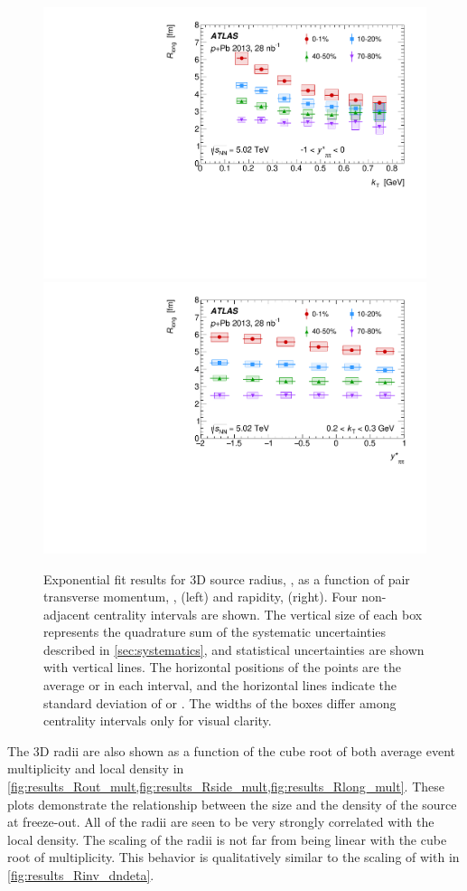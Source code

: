 \begin{figure}[t]
\centering
\includegraphics[width=.49\linewidth]{canqosl_Rlong_vs_kt.pdf}
\includegraphics[width=.49\linewidth]{canqosl_Rlong_vs_kys.pdf}
\caption{Exponential fit results for 3D source radius, \Rlong, as a function of pair transverse momentum, \kt, (left) and rapidity, \kys (right). Four non-adjacent centrality intervals are shown. The vertical size of each box represents the quadrature sum of the systematic uncertainties described in \cref{sec:systematics}, and statistical uncertainties are shown with vertical lines. The horizontal positions of the points are the average \kt or \kys in each interval, and the horizontal lines indicate the standard deviation of \kt or \kys. The widths of the boxes differ among centrality intervals only for visual clarity.}
\label{fig:results_Rlong}
\end{figure}

The 3D radii are also shown as a function of the cube root of both average event multiplicity and local density
in \cref{fig:results_Rout_mult,fig:results_Rside_mult,fig:results_Rlong_mult}.
These plots demonstrate the relationship between the size and the density of the source at freeze-out.
All of the radii are seen to be very strongly correlated with the local density.
The scaling of the radii is not far from being linear with the cube root of multiplicity.
This behavior is qualitatively similar to the scaling of \Rinv with \avgdNdeta in \cref{fig:results_Rinv_dndeta}.


